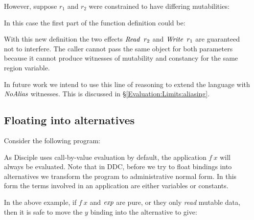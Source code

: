 However, suppose $r_1$ and $r_2$ were constrained to have differing mutabilities:


In this case the first part of the function definition could be:


With this new definition the two effects $\operatorname{\mathit{Read}} \ r_2$ and $\operatorname{\mathit{Write}} \ r_1$ are guaranteed not to interfere. The caller cannot pass the same object for both parameters because it cannot produce witnesses of mutability and constancy for the same region variable.

In future work we intend to use this line of reasoning to extend the language with $\operatorname{\mathit{NoAlias}}$ witnesses. This is discussed in \S\ref{Evaluation:Limits:aliasing}.



\subsection{Floating into alternatives}

Consider the following program:


As Disciple uses call-by-value evaluation by default, the application $f \ x$ will always be evaluated. Note that in DDC, before we try to float bindings into alternatives we transform the program to administrative normal form. In this form the terms involved in an application are either variables or constants. 

In the above example, if $f \ x$ and $\operatorname{\mathit{exp}}$ are pure, or they only \emph{read} mutable data, then it is safe to move the $y$ binding into the alternative to give:

